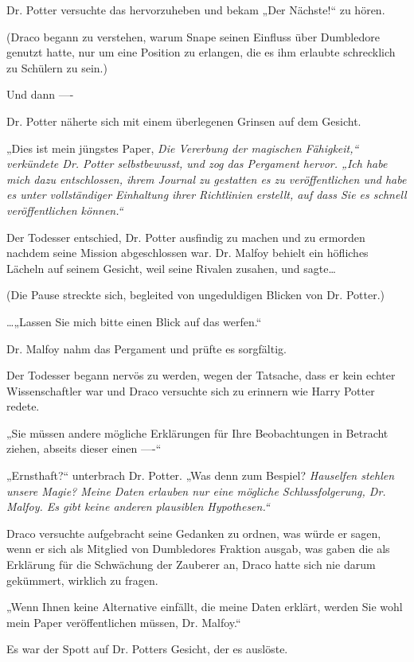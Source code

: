 {Dr. Potter versuchte das hervorzuheben und bekam „Der Nächste!“ zu hören.

(Draco begann zu verstehen, warum Snape seinen Einfluss über Dumbledore genutzt hatte, nur um eine Position zu erlangen, die es ihm erlaubte schrecklich zu Schülern zu sein.)

Und dann ----

Dr. Potter näherte sich mit einem überlegenen Grinsen auf dem Gesicht.

„Dies ist mein jüngstes Paper, \emph{Die Vererbung der magischen Fähigkeit,“ verkündete Dr. Potter selbstbewusst, und zog das Pergament hervor. „Ich habe mich dazu entschlossen, ihrem Journal zu gestatten es zu veröffentlichen und habe es unter vollständiger Einhaltung ihrer Richtlinien erstellt, auf dass Sie es schnell veröffentlichen können.“}

Der Todesser entschied, Dr. Potter ausfindig zu machen und zu ermorden nachdem seine Mission abgeschlossen war. Dr. Malfoy behielt ein höfliches Lächeln auf seinem Gesicht, weil seine Rivalen zusahen, und sagte…

(Die Pause streckte sich, begleited von ungeduldigen Blicken von Dr. Potter.)

…„Lassen Sie mich bitte einen Blick auf das werfen.“

Dr. Malfoy nahm das Pergament und prüfte es sorgfältig.

Der Todesser begann nervös zu werden, wegen der Tatsache, dass er kein echter Wissenschaftler war und Draco versuchte sich zu erinnern wie Harry Potter redete.

„Sie müssen andere mögliche Erklärungen für Ihre Beobachtungen in Betracht ziehen, abseits dieser einen ----“

„Ernsthaft?“ unterbrach Dr. Potter. „Was denn zum Bespiel? \emph{Hauselfen stehlen unsere Magie? Meine Daten erlauben nur eine mögliche Schlussfolgerung, Dr. Malfoy. Es gibt keine anderen plausiblen Hypothesen.“}

Draco versuchte aufgebracht seine Gedanken zu ordnen, was würde er sagen, wenn er sich als Mitglied von Dumbledores Fraktion ausgab, was gaben die als Erklärung für die Schwächung der Zauberer an, Draco hatte sich nie darum gekümmert, wirklich zu fragen.

„Wenn Ihnen keine Alternative einfällt, die meine Daten erklärt, werden Sie wohl mein Paper veröffentlichen müssen, Dr. Malfoy.“

Es war der Spott auf Dr. Potters Gesicht, der es auslöste.

}
